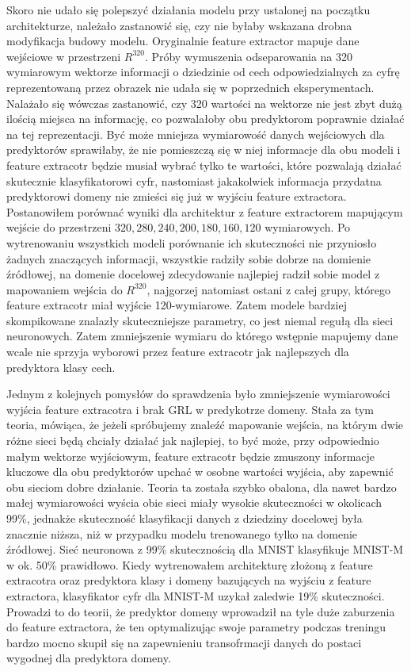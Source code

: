 \documentclass{article}
\begin{document}
Skoro nie udało się polepszyć działania modelu przy ustalonej na początku architekturze, należało zastanowić się, czy nie byłaby wskazana drobna modyfikacja budowy modelu. Oryginalnie feature extractor mapuje dane wejściowe w przestrzeni $ R^{320} $. Próby wymuszenia odseparowania na 320 wymiarowym wektorze informacji o dziedzinie od cech odpowiedzialnych za cyfrę reprezentowaną przez obrazek nie udała się w poprzednich eksperymentach. Nalażało się wówczas zastanowić, czy 320 wartości na wektorze nie jest zbyt dużą ilością miejsca na informację, co pozwalałoby obu predyktorom poprawnie działać na tej reprezentacji. Być może mniejsza wymiarowość danych wejściowych dla predyktorów sprawiłaby, że nie pomieszczą się w niej informacje dla obu modeli i feature extracotr będzie musiał wybrać tylko te wartości, które pozwalają działać skutecznie klasyfikatorowi cyfr, nastomiast jakakolwiek informacja przydatna predyktorowi domeny nie zmieści się już w wyjściu feature extractora. Postanowiłem porównać wyniki dla architektur z feature extractorem mapującym wejście do przestrzeni ${320, 280, 240, 200, 180, 160, 120}$ wymiarowych. Po wytrenowaniu wszystkich modeli porównanie ich skuteczności nie przyniosło żadnych znaczących informacji, wszystkie radziły sobie dobrze na domienie źródłowej, na domenie docelowej zdecydowanie najlepiej radził sobie model z mapowaniem wejścia do $R^{320}$, najgorzej natomiast ostani z całej grupy, którego feature extracotr miał wyjście 120-wymiarowe. Zatem modele bardziej skompikowane znalazły skuteczniejsze parametry, co jest niemal regułą dla sieci neuronowych. Zatem zmniejszenie wymiaru do którego wstępnie mapujemy dane wcale nie sprzyja wyborowi przez feature extracotr jak najlepszych dla predyktora klasy cech.
\par
Jednym z kolejnych pomysłów do sprawdzenia było zmniejszenie wymiarowości wyjścia feature extracotra i brak GRL w predykotrze domeny. Stała za tym teoria, mówiąca, że jeżeli spróbujemy znaleźć mapowanie wejścia, na którym dwie różne sieci będą chciały działać jak najlepiej, to być może, przy odpowiednio małym wektorze wyjściowym, feature extracotr będzie zmuszony informacje kluczowe dla obu predyktorów upchać w osobne wartości wyjścia, aby zapewnić obu sieciom dobre działanie. Teoria ta została szybko obalona, dla nawet bardzo małej wymiarowości wyścia obie sieci miały wysokie skuteczności w okolicach 99\%, jednakże skuteczność klasyfikacji danych z dziedziny docelowej była znacznie niższa, niż w przypadku modelu trenowanego tylko na domenie źródłowej. Sieć neuronowa z 99\% skutecznością dla MNIST klasyfikuje MNIST-M w ok. 50\% prawidłowo. Kiedy wytrenowałem architekturę złożoną z feature extracotra oraz predyktora klasy i domeny bazujących na wyjściu z feature extractora, klasyfikator cyfr dla MNIST-M uzykał zaledwie 19\% skuteczności. Prowadzi to do teorii, że predyktor domeny wprowadził na tyle duże zaburzenia do feature extractora, że ten optymalizując swoje parametry podczas treningu bardzo mocno skupił się na zapewnieniu transofrmacji danych do postaci wygodnej dla predyktora domeny.
\end{document}
